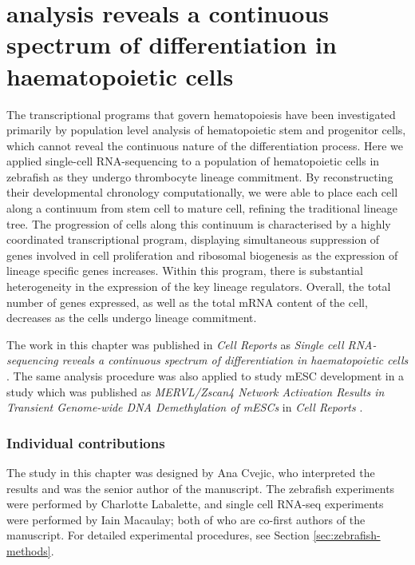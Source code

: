 
\chapter{ analysis reveals a continuous spectrum of differentiation in haematopoietic cells} \label{ch:zebrafish}

\graphicspath{{Chapter3/Figs/}}

The transcriptional programs that govern hematopoiesis have been investigated primarily by population level analysis of hematopoietic stem and progenitor cells, which cannot reveal the continuous nature of the differentiation process. Here we applied single-cell RNA-sequencing to a population of hematopoietic cells in zebrafish as they undergo thrombocyte lineage commitment. By reconstructing their developmental chronology computationally, we were able to place each cell along a continuum from stem cell to mature cell, refining the traditional lineage tree. The progression of cells along this continuum is characterised by a highly coordinated transcriptional program, displaying simultaneous suppression of genes involved in cell proliferation and ribosomal biogenesis as the expression of lineage specific genes increases. Within this program, there is substantial heterogeneity in the expression of the key lineage regulators. Overall, the total number of genes expressed, as well as the total mRNA content of the cell, decreases as the cells undergo lineage commitment.

The work in this chapter was published in \textit{Cell Reports} as \textit{Single cell RNA-sequencing reveals a continuous spectrum of differentiation in haematopoietic cells} \cite{Macaulay2016-zd}. The same analysis procedure was also applied to study mESC development in a study which was published as \textit{MERVL/Zscan4 Network Activation Results in Transient Genome-wide DNA Demethylation of mESCs} in \textit{Cell Reports} \cite{Eckersley-Maslin2016-cz}.

\subsection*{Individual contributions}

The study in this chapter was designed by Ana Cvejic, who interpreted the results and was the senior author of the manuscript. The zebrafish experiments were performed by Charlotte Labalette, and single cell RNA-seq experiments were performed by Iain Macaulay; both of who are co-first authors of the manuscript. For detailed experimental procedures, see Section \ref{sec:zebrafish-methods}.

